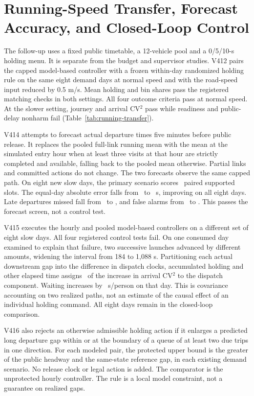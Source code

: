 \section{Running-Speed Transfer, Forecast Accuracy, and Closed-Loop Control}
The follow-up uses a fixed public timetable, a 12-vehicle pool and a
0/5/10-s holding menu. It is separate from the budget and supervisor studies.
V412 pairs the capped model-based controller with a frozen within-day
randomized holding rule on the same eight demand days at normal speed and
with the road-speed input reduced by 0.5 m/s. Mean holding and bin shares
pass the registered matching checks in both settings. All four outcome
criteria pass at normal speed. At the slower setting, journey and arrival
CV$^2$ pass while readiness and public-delay nonharm fail
(Table~\ref{tab:running-transfer}).

V414 attempts to forecast actual departure times five minutes before
public release. It replaces the pooled full-link running mean
with the mean at the simulated entry hour when at least three visits at
that hour are strictly completed and available, falling back to the pooled
mean otherwise. Partial links and committed actions do not change.
The two forecasts observe the same capped path. On eight new slow days,
the primary scenario scores \ForecastSlotPairs\ paired supported slots.
The equal-day absolute error falls from \ForecastPooledMAE\ to
\ForecastHourlyMAE\ s, improving on all eight days. Late departures missed
fall from \ForecastPooledMisses\ to \ForecastHourlyMisses, and false alarms
from \ForecastPooledAlarms\ to \ForecastHourlyAlarms. This passes the
forecast screen, not a control test.

V415 executes the hourly and pooled model-based controllers on a different
set of eight slow days. All four registered control tests fail. On one
consumed day examined to explain that failure, two successive launches
advanced by different amounts, widening the interval from 184 to 1,088 s.
Partitioning each actual downstream gap into the difference in dispatch
clocks, accumulated holding and other elapsed time assigns
\FocalLaunchComponent\ of the increase in arrival CV$^2$ to the dispatch
component. Waiting increases by \FocalWaitingLoss\ s/person on that day.
This is covariance accounting on two realized paths, not an estimate of
the causal effect of an individual holding command. All eight days remain
in the closed-loop comparison.


V416 also rejects an otherwise admissible holding action if it enlarges a
predicted long departure gap within or at the boundary of a queue of at
least two due trips in one direction. For each modeled pair, the protected
upper bound is the greater of the public headway and the same-state
reference gap, in each existing demand scenario. No release clock or
legal action is added. The comparator is the unprotected hourly controller.
The rule is a local model constraint, not a guarantee on realized gaps.

